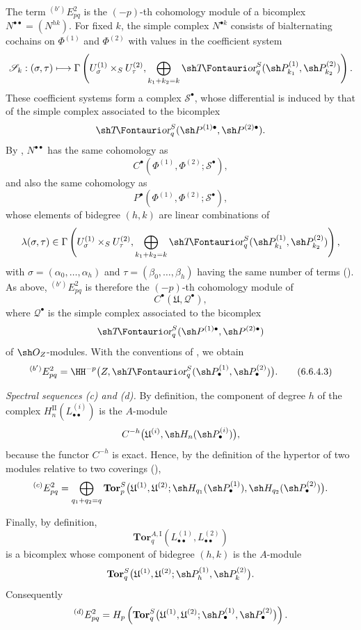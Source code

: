 \begin{env}[6.6.4]
The term ${}^{(b')}E_{pq}^2$ is the $(-p)$-th cohomology module
of a bicomplex $N^{\bullet\bullet}=(N^{hk})$.  For fixed $k$,
the simple complex $N^{\bullet k}$ consists of bialternating
cochains on $\Phi^{(1)}$ and $\Phi^{(2)}$ with values in the
coefficient system
\[
  \mathcal S_k:(\sigma,\tau)\longmapsto
  \Gamma\left(
    U_\sigma^{(1)}\times_SU_\tau^{(2)},
    \bigoplus_{k_1+k_2=k}
    \shTor_q^S(\sh P_{k_1}^{(1)},\sh P_{k_2}^{(2)})
  \right).
\]
These coefficient systems form a complex
$\mathcal S^\bullet$, whose differential is induced by that of
the simple complex associated to the bicomplex
\[
  \shTor_q^S
  (\sh P^{(1)\bullet},\sh P^{(2)\bullet}).
\]
By , $N^{\bullet\bullet}$ has the same
cohomology as
\[
  C^\bullet
  (\Phi^{(1)},\Phi^{(2)};\mathcal S^\bullet),
\]
and also the same cohomology as
\[
  P^\bullet
  (\Phi^{(1)},\Phi^{(2)};\mathcal S^\bullet),
\]
whose elements of bidegree $(h,k)$ are linear combinations of
\[
  \lambda(\sigma,\tau)\in
  \Gamma\left(
    U_\sigma^{(1)}\times_SU_\tau^{(2)},
    \bigoplus_{k_1+k_2=k}
    \shTor_q^S(\sh P_{k_1}^{(1)},\sh P_{k_2}^{(2)})
  \right),
\]
with $\sigma=(\alpha_0,\ldots,\alpha_h)$ and
$\tau=(\beta_0,\ldots,\beta_h)$ having the same number of terms
().  As above, ${}^{(b')}E_{pq}^2$ is
therefore the $(-p)$-th cohomology module of
\[
  C^\bullet(\mathfrak U,\mathcal Q^\bullet),
\]
where $\mathcal Q^\bullet$ is the simple complex associated to
the bicomplex
\[
  \shTor_q^S
  (\sh P^{(1)\bullet},\sh P^{(2)\bullet})
\]
of $\sh O_Z$-modules.  With the conventions of
, we obtain
\[
  {}^{(b')}E_{pq}^2
  =
  \HH^{-p}
  \bigl(
    Z,\shTor_q^S
    (\sh P_\bullet^{(1)},\sh P_\bullet^{(2)})
  \bigr).
  \tag{6.6.4.3}\label{III.6.6.4.3}
\]
\end{env}


\begin{env}[6.6.5]
\label{III.6.6.5}
\emph{Spectral sequences \textnormal{(c)} and
\textnormal{(d)}.}
By definition, the component of degree $h$ of the complex
$H_n^{\mathrm{II}}(L_{\bullet\bullet}^{(i)})$ is the
$A$-module
\[
  C^{-h}
  \bigl(
    \mathfrak U^{(i)},
    \sh H_n(\sh P_\bullet^{(i)})
  \bigr),
\]
because the functor $C^{-h}$ is exact.  Hence, by the definition
of the hypertor of two modules relative to two coverings
(),
\[
  {}^{(c)}E_{pq}^2
  =
  \bigoplus_{q_1+q_2=q}
  \mathbf{Tor}_p^S
  \bigl(
    \mathfrak U^{(1)},\mathfrak U^{(2)};
    \sh H_{q_1}(\sh P_\bullet^{(1)}),
    \sh H_{q_2}(\sh P_\bullet^{(2)})
  \bigr).
\]

Finally, by definition,
\[
  \mathbf{Tor}_q^{A,\mathrm I}
  (L_{\bullet\bullet}^{(1)},L_{\bullet\bullet}^{(2)})
\]
is a bicomplex whose component of bidegree $(h,k)$ is the
$A$-module
\[
  \mathbf{Tor}_q^S
  \bigl(
    \mathfrak U^{(1)},\mathfrak U^{(2)};
    \sh P_h^{(1)},\sh P_k^{(2)}
  \bigr).
\]
Consequently
\[
  {}^{(d)}E_{pq}^2
  =
  H_p\left(
    \mathbf{Tor}_q^S
    \bigl(
      \mathfrak U^{(1)},\mathfrak U^{(2)};
      \sh P_\bullet^{(1)},\sh P_\bullet^{(2)}
    \bigr)
  \right).
\]
\end{env}

